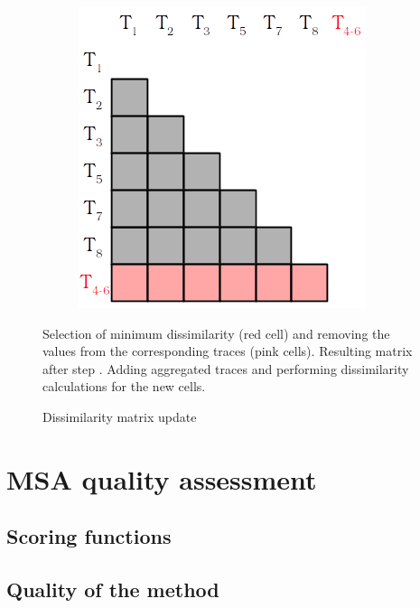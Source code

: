 \documentclass[12pt,a4paper]{article}
\begin{document}
\begin{figure}[H]
\begin{subfigure}[t]{0.33\linewidth}
		\includegraphics[width=0.7\linewidth]{img/matrix3.png}
		\caption{}
		\label{sub:matrix3}
	\end{subfigure}
	\caption{Dissimilarity matrix update}{
		\emph{\color{blue}{(a)}} Selection of minimum dissimilarity (red cell) and removing the values from the corresponding traces (pink cells).
		\emph{\color{blue}{(b)}} Resulting matrix after step \emph{\color{blue}{a}}.
		\emph{\color{blue}{(c)}} Adding aggregated traces and performing dissimilarity calculations for the new cells.
	}
	\label{fig:matrix}
\end{figure}




\section{MSA quality assessment}

\subsection{Scoring functions}

\subsection{Quality of the method}



\end{document}

